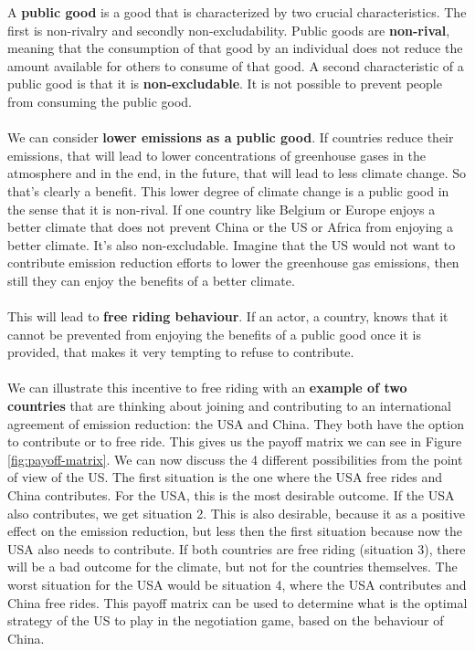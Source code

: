 \documentclass[../summary.tex]{subfiles}
\begin{document}
	  A \textbf{public good} is a good that is characterized by two crucial characteristics. The first is non-rivalry and secondly non-excludability. Public goods are \textbf{non-rival}, meaning that the consumption of that good by an individual does not reduce the amount available for others to consume of that good. A second characteristic of a public good is that it is \textbf{non-excludable}. It is not possible to prevent people from consuming the public good. 
	  \\\\
	  We can consider \textbf{lower emissions as a public good}. If countries reduce their emissions, that will lead to lower concentrations of greenhouse gases in the atmosphere and in the end, in the future, that will lead to less climate change. So that's clearly a benefit. This lower degree of climate change is a public good in the sense that it is non-rival. If one country like Belgium or Europe enjoys a better climate that does not prevent China or the US or Africa from enjoying a better climate. It’s also non-excludable. Imagine that the US would not want to contribute emission reduction efforts to lower the greenhouse gas emissions, then still they can enjoy the benefits of a better climate.
	  \\\\
	  This will lead to \textbf{free riding behaviour}. If an actor, a country, knows that it cannot be prevented from enjoying the benefits of a public good once it is provided, that makes it very tempting to refuse to contribute. 
	  \\\\
	  We can illustrate this incentive to free riding with an \textbf{example of two countries} that are thinking about joining and contributing to an international agreement of emission reduction: the USA and China. They both have the option to contribute or to free ride. This gives us the payoff matrix we can see in Figure \ref{fig:payoff-matrix}. We can now discuss the 4 different possibilities from the point of view of the US. The first situation is the one where the USA free rides and China contributes. For the USA, this is the most desirable outcome. If the USA also contributes, we get situation 2. This is also desirable, because it as a positive effect on the emission reduction, but less then the first situation because now the USA also needs to contribute. If both countries are free riding (situation 3), there will be a bad outcome for the climate, but not for the countries themselves. The worst situation for the USA would be situation 4, where the USA contributes and China free rides. This payoff matrix can be used to determine what is the optimal strategy of the US to play in the negotiation game, based on the behaviour of China.
	  
\end{document}
